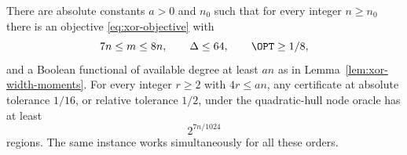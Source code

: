 \begin{theorem}\label{thm:xor-family}
There are absolute constants $a>0$ and $n_0$ such that for every integer
$n\ge n_0$ there is an objective \eqref{eq:xor-objective} with
\begin{equation}\label{eq:xor-family-parameters}
 7n\le m\le8n,\qquad \Delta\le64,\qquad \OPT\ge1/8,
\end{equation}
and a Boolean functional of available degree at least $an$ as in
Lemma~\ref{lem:xor-width-moments}. For every integer $r\ge2$ with
$4r\le an$, any certificate at absolute tolerance $1/16$, or relative
tolerance $1/2$, under the quadratic-hull node oracle has at least
\begin{equation}\label{eq:xor-family-count}
 2^{7n/1024}
\end{equation}
regions. The same instance works simultaneously for all these orders.
\end{theorem}
